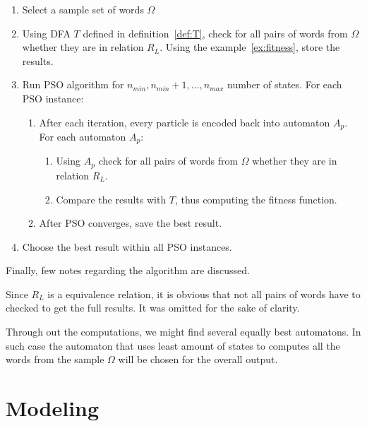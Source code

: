 \documentclass[runningheads, a4paper]{llncs}
\begin{document}
\begin{enumerate}
	\item Select a sample set of words $\Omega$
	\item Using DFA $T$ defined in definition~\ref{def:T}, check for all pairs of words from $\Omega$ whether they are in relation $R_L$. Using the example~\ref{ex:fitness}, store the results.
	\item Run PSO algorithm for $n_{min}, n_{min}+1, \ldots, n_{max}$ number of states. For each PSO instance:
	
	\begin{enumerate}
		\item After each iteration, every particle is encoded back into automaton $A_p$. For each automaton $A_p$:
		\begin{enumerate}
			\item Using $A_p$ check for all pairs of words from $\Omega$ whether they are in relation $R_L$.
			\item Compare the results with $T$, thus computing the fitness function.
		\end{enumerate}

		\item After PSO converges, save the best result.
	\end{enumerate}		
	
	\item Choose the best result within all PSO instances.
\end{enumerate}

Finally, few notes regarding the algorithm are discussed. 

Since $R_L$ is a equivalence relation, it is obvious that not all pairs of words have to checked to get the full results. It was omitted for the sake of clarity.

Through out the computations, we might find several equally best automatons. In such case the automaton that uses least amount of states to computes all the words from the sample $\Omega$ will be chosen for the overall output.









\section{Modeling}
\end{document}

